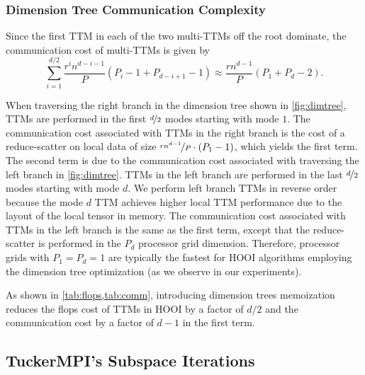     \subsubsection{Dimension Tree Communication Complexity} \label{sec:Dimension Tree Communication Complexity}

        Since the first TTM in each of the two multi-TTMs off the root dominate,
        the communication cost of multi-TTMs is given by
        \begin{equation*}
            \sum_{i=1}^{d/2}  \frac{r^in^{d-i-1}}{P}\left(P_i - 1 + P_{d-i+1} - 1\right) \approx   \frac{rn^{d-1}}{P} \left(P_1 + P_d - 2\right).
        \end{equation*}
        
        When traversing the right branch in the dimension tree shown in
        \cref{fig:dimtree}, TTMs are performed in the first $\nicefrac d2$ modes
        starting with mode $1$. The communication cost associated with TTMs in
        the right branch is the cost of a reduce-scatter on local data of size
        $\nicefrac{rn^{d-1}}{P}\cdot(P_1-1)$, which yields the first term. The
        second term is due to the communication cost associated with traversing
        the left branch in \cref{fig:dimtree}. TTMs in the left branch are
        performed in the last $\nicefrac d2$ modes starting with mode $d$. We
        perform left branch TTMs in reverse order because the mode $d$ TTM
        achieves higher local TTM performance due to the layout of the local
        tensor in memory. The communication cost associated with TTMs in the
        left branch is the same as the first term, except that the
        reduce-scatter is performed in the $P_d$ processor grid dimension.
        Therefore, processor grids with $P_1 = P_d = 1$ are typically the
        fastest for HOOI algorithms employing the dimension tree optimization
        (as we observe in our experiments).

        As shown in \cref{tab:flops,tab:comm}, introducing dimension trees
        memoization reduces the flops cost of TTMs in HOOI by a factor of $d/2$
        and the communication cost by a factor of $d-1$ in the first term.


\subsection{TuckerMPI's Subspace Iterations} \label{TuckerMPI's Subspace Iterations}

